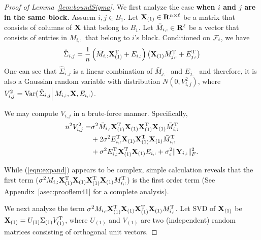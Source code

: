 \begin{proof}[Proof of Lemma~\ref{lem:boundSigma}] 
We first analyze the case \textbf{
when $i$ and $j$ are in the same block.} 
Assuem $i, j \in B_1$. Let $\mathbf{X}_{(1)} \in \mathbf{R}^{n \times \ell}$ be a matrix that consists of columns of $\mathbf{X}$ that belong to $B_1$. Let $\bar M_{i,:} \in \mathbf{R}^{\ell}$ be a vector that consists of entries in $M_{i, :}$ that belong to $i$'s block.  
Conditioned on $\mathcal{F}_i$, we have 
\begin{equation}
\begin{split}
    \hat{\Sigma}_{i,j}=\frac{1}{n} \left( \bar M_{i,:}\mathbf{X}^{\mathrm{T}}_{(1)}+E_{i,:} \right)\left( \mathbf{X}_{(1)}\bar M^{\mathrm{T}}_{j,:}+E^{\mathrm{T}}_{j,:} \right)\end{split}
\end{equation}
One can see that $\hat \Sigma_{i, j}$ is a linear combination of $\bar M_{j, :}$ and $E_{j,:}$ and therefore, it is also a Gaussian random variable with distribution $N(0, V^2_{i,j})$, where $V^2_{i,j}=\mathrm{Var}(\left. \hat{\Sigma}_{i,j} \right| M_{i,:},\mathbf{X},E_{i,:} )$.

We may compute $V_{i,j}$ in a brute-force manner. Specifically, 
\begin{equation}\label{eqn:expand}
\begin{split}
    n^2V^2_{i,j} = & \sigma^2 \bar M_{i, :} \mathbf{X}_{(1)}^{\mathrm{T}}\mathbf{X}_{(1)}\mathbf{X}_{(1)}^{\mathrm{T}}\mathbf{X}_{(1)}\bar M^{\mathrm{T}}_{i, :} \\
    & + 2\sigma^2 E^{\mathrm{T}}_{i,:} \mathbf{X}_{(1)}\mathbf{X}^{\mathrm{T}}_{(1)}\mathbf{X}_{(1)}\bar M^{\mathrm{T}}_{i, :} \\
    & + \sigma^2 E^{\mathrm{T}}_{i,:}  \mathbf{X}^{\mathrm{T}}_{(1)} \mathbf{X}_{(1)}E_{i,:} + \sigma^2_{\epsilon} \|\mathbf{Y}_{i, :}\|^2_F.
\end{split}
\end{equation}

While (\ref{eqn:expand}) appears to be complex, simple calculation reveals that the first term ($\sigma^2 M_{i, :}\mathbf{X}_{(1)}^{\mathrm{T}}\mathbf{X}_{(1)}\mathbf{X}_{(1)}^{\mathrm{T}}\mathbf{X}_{(1)}M^{\mathrm{T}}_{i, :}$) is the first order term (See Appendix~\ref{asec:prooflem41} for a complete analysis). 

We next analyze the term $\sigma^2 M_{i, :}\mathbf{X}_{(1)}^{\mathrm{T}}\mathbf{X}_{(1)}\mathbf{X}_{(1)}^{\mathrm{T}}\mathbf{X}_{(1)}M^{\mathrm{T}}_{i, :}$. Let SVD of $\mathbf{X}_{(1)}$ be $\mathbf{X}_{(1)} = U_{(1)} \Sigma_{(1)} V^{\mathrm{T}}_{(1)}$, where  $U_{(1)}$ and $V_{(1)}$ are two (independent) random matrices consisting of orthogonal unit vectors.


\end{proof}
